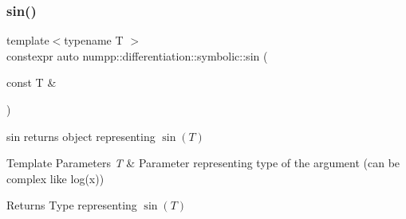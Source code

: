 \subsubsection{\texorpdfstring{sin()}{sin()}}
{\footnotesize\ttfamily template$<$typename T $>$ \\
constexpr auto numpp\+::differentiation\+::symbolic\+::sin (\begin{DoxyParamCaption}\item[{const T \&}]{ }\end{DoxyParamCaption})}

sin returns object representing $ \sin(T) $ 
\begin{DoxyTemplParams}{Template Parameters}
{\em T} & Parameter representing type of the argument (can be complex like log(x))\\
\hline
\end{DoxyTemplParams}
\begin{DoxyReturn}{Returns}
Type representing $ \sin(T) $
\end{DoxyReturn}

